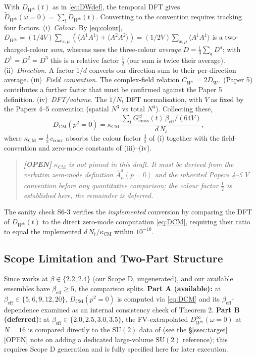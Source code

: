 \documentclass[11pt,a4paper]{article}
\theoremstyle{plain}
\theoremstyle{definition}
\theoremstyle{remark}
\newcommand{\SU}{\mathrm{SU}}
\newcommand{\Gcrossgf}{G_{\mathrm{cross}}^{\mathrm{gf}}}
\newcommand{\DW}{D_{W^{\pm}}}
\newcommand{\DWt}{\widetilde{D}_{W^{\pm}}}
\newcommand{\be}{\beta_{\mathrm{eff}}}
\newcommand{\Nt}{N_{t}}
\begin{document}
With $\DW(t)$ as in \eqref{eq:DWdef}, the temporal DFT gives
$\DWt(\omega{=}0)=\sum_{t}\DW(t)$. Converting to the \cite{CM}
convention requires tracking four factors. (i)~\emph{Colour.} By
\eqref{eq:colour}, $\DW=(1/4V)\sum_{x,\mu}(\langle A^1A^1\rangle+\langle
A^2A^2\rangle)=(1/2V)\sum_{x,\mu}\langle A^1A^1\rangle$ is a
two-charged-colour \emph{sum}, whereas \cite{CM} uses the three-colour
\emph{average} $D=\tfrac13\sum_a D^a$; with $D^1=D^2=D^3$ this is a
relative factor $\tfrac12$ (our sum is twice their average).
(ii)~\emph{Direction.} A factor $1/d$ converts our direction sum to their
per-direction average. (iii)~\emph{Field convention.} The complex-field
relation $C_{W^\pm}=2\DW$ (Paper 5) contributes a further factor that must
be confirmed against the Paper 5 definition. (iv)~\emph{DFT/volume.} The
$1/\Nt$ DFT normalisation, with $V$ as fixed by the Papers 4--5 convention
(spatial $N^3$ vs total $N^4$). Collecting these,
\begin{equation}
  D_{\mathrm{CM}}(p^2{=}0)
  =\kappa_{\mathrm{CM}}\,
   \frac{\sum_t\Gcrossgf(t)\,\be/(64V)}{d\,\Nt},
  \label{eq:DCM}
\end{equation}
where $\kappa_{\mathrm{CM}}=\tfrac12\,c_{\mathrm{conv}}$ absorbs the colour
factor $\tfrac12$ of (i) together with the field-convention and zero-mode
constants of (iii)--(iv).
\begin{quote}\itshape\textbf{[OPEN]} $\kappa_{\mathrm{CM}}$ is not pinned in
this draft. It must be derived from the verbatim \cite{CM} zero-mode
definition $\hat A^a_\mu(p{=}0)$ and the inherited Papers 4--5 $V$
convention before any quantitative comparison; the colour factor $\tfrac12$
is established here, the remainder is deferred.\end{quote}
The sanity check S6-3 verifies the \emph{implemented} conversion by
comparing the DFT of $\DW(t)$ to the direct zero-mode computation
\eqref{eq:DCM}, requiring their ratio to equal the implemented
$d\,\Nt/\kappa_{\mathrm{CM}}$ within $10^{-10}$.

\subsection{Scope Limitation and Two-Part Structure}
\label{ssec:scopesplit}

Since \cite{CM} works at $\beta\in\{2.2,2.4\}$ (our Scope D,
ungenerated), and our available ensembles have $\be\ge5$, the comparison
splits. \textbf{Part A (available):} at $\be\in\{5,6,9,12,20\}$,
$D_{\mathrm{CM}}(p^2{=}0)$ is computed via \eqref{eq:DCM} and its
$\be$-dependence examined as an internal consistency check of Theorem 2.
\textbf{Part B (deferred):} at $\be\in\{2.0,2.5,3.0,3.5\}$, the
FV-extrapolated $\DW^{\infty}(\omega{=}0)$ at $N=16$ is compared directly
to the $\SU(2)$ data of \cite{CM} (see the \S\ref{ssec:target} [OPEN] note
on adding a dedicated large-volume $\SU(2)$ reference); this requires Scope D
generation and is fully specified
here for later execution.
\end{document}
